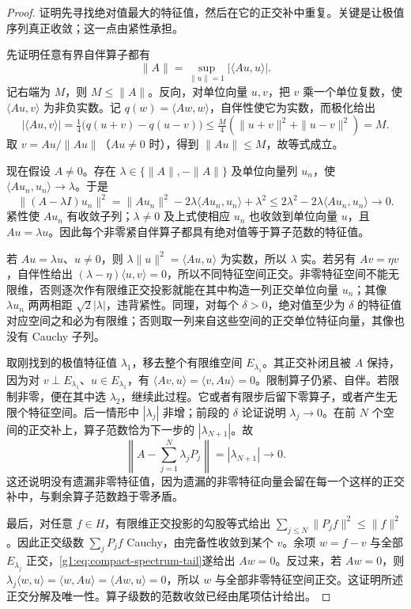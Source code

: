 \begin{proof}
	证明先寻找绝对值最大的特征值，然后在它的正交补中重复。关键是让极值序列真正收敛；这一点由紧性承担。

	先证明任意有界自伴算子都有
	\[
		\|A\|=\sup_{\|u\|=1}|\langle Au,u\rangle|.
	\]
	记右端为 \(M\)，则 \(M\le\|A\|\)。反向，对单位向量 \(u,v\)，把 \(v\) 乘一个单位复数，使 \(\langle Au,v\rangle\) 为非负实数。记 \(q(w)=\langle Aw,w\rangle\)，自伴性使它为实数，而极化给出
	\[
		|\langle Au,v\rangle|
		=\tfrac14\bigl(q(u+v)-q(u-v)\bigr)
		\le\tfrac M4(\|u+v\|^2+\|u-v\|^2)=M.
	\]
	取 \(v=Au/\|Au\|\)（\(Au\ne0\) 时），得到 \(\|Au\|\le M\)，故等式成立。

	现在假设 \(A\ne0\)。存在 \(\lambda\in\{\|A\|,-\|A\|\}\) 及单位向量列 \(u_n\)，使 \(\langle Au_n,u_n\rangle\to\lambda\)。于是
	\[
		\|(A-\lambda I)u_n\|^2
		=\|Au_n\|^2-2\lambda\langle Au_n,u_n\rangle+\lambda^2
		\le2\lambda^2-2\lambda\langle Au_n,u_n\rangle\longrightarrow0.
	\]
	紧性使 \(Au_n\) 有收敛子列；\(\lambda\ne0\) 及上式使相应 \(u_n\) 也收敛到单位向量 \(u\)，且 \(Au=\lambda u\)。因此每个非零紧自伴算子都具有绝对值等于算子范数的特征值。

	若 \(Au=\lambda u\)、\(u\ne0\)，则 \(\lambda\|u\|^2=\langle Au,u\rangle\) 为实数，所以 \(\lambda\) 实。若另有 \(Av=\eta v\)，自伴性给出 \((\lambda-\eta)\langle u,v\rangle=0\)，所以不同特征空间正交。非零特征空间不能无限维，否则逐次作有限维正交投影就能在其中构造一列正交单位向量 \(u_n\)；其像 \(\lambda u_n\) 两两相距 \(\sqrt2|\lambda|\)，违背紧性。同理，对每个 \(\delta>0\)，绝对值至少为 \(\delta\) 的特征值对应空间之和必为有限维；否则取一列来自这些空间的正交单位特征向量，其像也没有 Cauchy 子列。

	取刚找到的极值特征值 \(\lambda_1\)，移去整个有限维空间 \(E_{\lambda_1}\)。其正交补闭且被 \(A\) 保持，因为对 \(v\perp E_{\lambda_1}\)、\(u\in E_{\lambda_1}\)，有 \(\langle Av,u\rangle=\langle v,Au\rangle=0\)。限制算子仍紧、自伴。若限制非零，便在其中选 \(\lambda_2\)，继续此过程。它或者有限步后留下零算子，或者产生无限个特征空间。后一情形中 \(|\lambda_j|\) 非增；前段的 \(\delta\) 论证说明 \(\lambda_j\to0\)。在前 \(N\) 个空间的正交补上，算子范数恰为下一步的 \(|\lambda_{N+1}|\)。故
	\begin{equation}\label{g1:eq:compact-spectrum-tail}
		\left\|A-\sum_{j=1}^N\lambda_jP_j\right\|
		=|\lambda_{N+1}|\longrightarrow0.
	\end{equation}
	这还说明没有遗漏非零特征值，因为遗漏的非零特征向量会留在每一个这样的正交补中，与剩余算子范数趋于零矛盾。

	最后，对任意 \(f\in H\)，有限维正交投影的勾股等式给出 \(\sum_{j\le N}\|P_jf\|^2\le\|f\|^2\)。因此正交级数 \(\sum_jP_jf\) Cauchy，由完备性收敛到某个 \(v\)。余项 \(w=f-v\) 与全部 \(E_{\lambda_j}\) 正交，\eqref{g1:eq:compact-spectrum-tail}遂给出 \(Aw=0\)。反过来，若 \(Aw=0\)，则 \(\lambda_j\langle w,u\rangle=\langle w,Au\rangle=\langle Aw,u\rangle=0\)，所以 \(w\) 与全部非零特征空间正交。这证明所述正交分解及唯一性。算子级数的范数收敛已经由尾项估计给出。
\end{proof}

